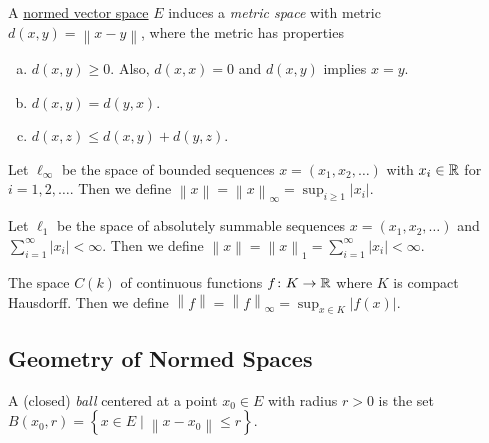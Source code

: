 \begin{remark}
	A \hyperref[def:normed-vector-space]{normed vector space} \(E\) induces a \emph{metric space} with metric \(d(x, y) = \left\lVert x- y\right\rVert \), where the metric has properties
	\begin{enumerate}[(a)]
		\item \(d(x, y) \geq 0\). Also, \(d(x, x) = 0\) and \(d(x, y)\) implies \(x =y\).
		\item \(d(x, y) = d(y, x)\).
		\item \(d(x, z) \leq d(x, y) + d(y, z)\).
	\end{enumerate}
\end{remark}

\begin{eg}
	Let \(\ell _\infty \) be the space of bounded sequences \(x = (x_1, x_2, \ldots )\) with \(x_i\in \mathbb{\MakeUppercase{r}} \) for \(i = 1, 2, \ldots \). Then we define \(\left\lVert x\right\rVert = \left\lVert x\right\rVert _\infty = \sup _{i \geq 1}\left\vert x_i \right\vert \).
\end{eg}

\begin{eg}
	Let \(\ell _1\) be the space of absolutely summable sequences \(x = (x_1, x_2, \ldots)\) and \(\sum_{i=1}^{\infty} \left\vert x_i \right\vert < \infty\). Then we define \(\left\lVert x\right\rVert = \left\lVert x\right\rVert _1 = \sum_{i=1}^{\infty} \left\vert x_i \right\vert < \infty\).
\end{eg}

\begin{eg}
	The space \(C(k)\) of continuous functions \(f\colon K\to \mathbb{\MakeUppercase{r}} \) where \(K\) is compact Hausdorff. Then we define \(\left\lVert f\right\rVert = \left\lVert f\right\rVert _\infty = \sup _{x\in K}\left\vert f(x) \right\vert \).
\end{eg}

\subsection{Geometry of Normed Spaces}
\begin{definition}[Ball]\label{def:ball}
	A (closed) \emph{ball} centered at a point \(x_0\in E\) with radius \(r>0\) is the set \(B(x_0, r) = \left\{ x\in E\mid \left\lVert x - x_0\right\rVert \leq r \right\} \).
\end{definition}

